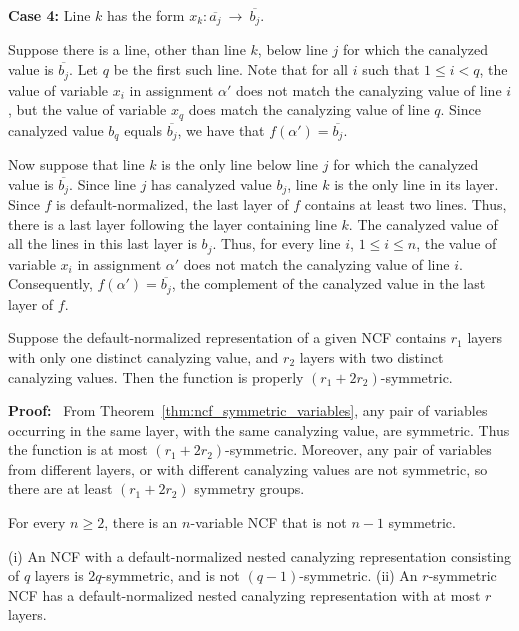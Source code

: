 \medskip

\noindent
{\bf Case 4:} Line $k$ has the form  $x_k : \overline{a_j} ~\longrightarrow~ \overline{b_j}$. 

\smallskip

Suppose there is a line, other than line $k$, below line $j$ for
which the canalyzed value is $\overline{b_j}$.  Let $q$ be the
first such line.  Note that for all $i$ such that $1 \leq i < q$,
the value of variable $x_i$ in assignment $\alpha'$ does not match
the canalyzing value of line $i$, but the value of variable $x_q$
does match the canalyzing value of line $q$.  Since canalyzed value
$b_q$ equals $\overline{b_j}$, we have that $f(\alpha') =
\overline{b_j}$.

Now suppose that line $k$ is the only line below line $j$ for which
the canalyzed value is $\overline{b_j}$.  Since line $j$ has
canalyzed value $b_j$, line $k$ is the only line in its layer.
Since $f$ is default-normalized, the last layer of $f$ contains at least
two lines.  Thus, there is a last layer following the layer containing
line $k$.  The canalyzed value of all the lines in this last layer
is $b_j$.  Thus, for every line $i$, $1 \leq i \leq n$, the value
of variable $x_i$ in assignment $\alpha'$ does not match the
canalyzing value of line $i$.  Consequently, $f(\alpha') =
\overline{b_j}$, the complement of the canalyzed value in the last
layer of $f$.  \QED

\begin{theorem}\label{thm:ncf_r_symmetric}
Suppose the default-normalized representation of a given NCF contains 
$r_1$ layers with only one distinct canalyzing value,
and $r_2$ layers with two distinct canalyzing values.
Then the function is properly $(r_1 + 2 r_2)$-symmetric.
\end{theorem}

\noindent
\textbf{Proof:}~
From Theorem~\ref{thm:ncf_symmetric_variables}, 
any pair of variables occurring in the same layer, 
with the same canalyzing value, are symmetric.
Thus the function is at most $(r_1 + 2 r_2)$-symmetric.
Moreover, any pair of variables from different layers, 
or with different canalyzing values
are not symmetric, so there are at least $(r_1 + 2 r_2)$ symmetry groups.
\QED

\begin{corollary}\label{cor:ncf_not_rsymm}
For every $n \geq 2$, there is an $n$-variable NCF that is not $n-1$ symmetric. \QED
\end{corollary}

\begin{corollary}\label{cor:ncf_r_symmetric_layers}
(i) An NCF with a default-normalized nested canalyzing representation consisting
of $q$ layers is $2q$-symmetric, and is not $(q-1)$-symmetric.
(ii) An $r$-symmetric NCF has a default-normalized 
nested canalyzing representation with at most $r$ layers. \QED
\end{corollary}

